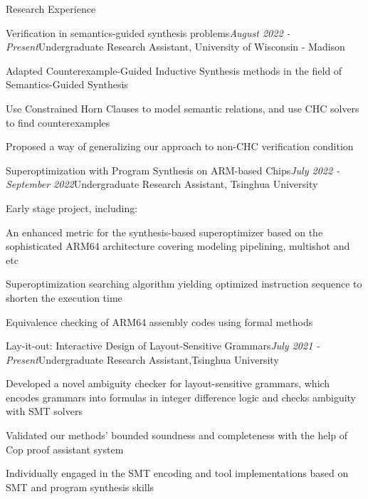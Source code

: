 \documentclass{resume} %
\newcommand{\Jul}{July }
\newcommand{\Aug}{August }
\newcommand{\Sept}{September }
\begin{document}
\begin{rSection}{Research Experience}

\begin{rSubsection}{Verification in semantics-guided synthesis problems}{\em \Aug 2022 - Present}{Undergraduate Research Assistant, \textup{University of Wisconsin - Madison}}{}

\item Adapted Counterexample-Guided Inductive Synthesis methods in the field of Semantics-Guided Synthesis
\item Use Constrained Horn Clauses to model semantic relations, and use CHC solvers to find counterexamples
\item Proposed a way of generalizing our approach to non-CHC verification condition

\end{rSubsection}
  
\begin{rSubsection}{Superoptimization with Program Synthesis on ARM-based Chips}{\em \Jul 2022 - \Sept 2022}{Undergraduate Research Assistant, \textup{Tsinghua University}}{}
    
\item Early stage project, including: 
\item An enhanced metric for the synthesis-based superoptimizer based on the sophisticated ARM64 architecture covering modeling pipelining, multishot and etc
\item Superoptimization searching algorithm yielding optimized instruction sequence to shorten the execution time
\item Equivalence checking of ARM64 assembly codes using formal methods

\end{rSubsection}



\begin{rSubsection}{Lay-it-out: Interactive Design of Layout-Sensitive Grammars}{\em \Jul 2021 - Present}{Undergraduate Research Assistant,\textup{Tsinghua University}}{}
    
\item Developed a novel ambiguity checker for layout-sensitive grammars, which encodes grammars into formulas in integer difference logic and checks ambiguity with SMT solvers
\item Validated our methods' bounded soundness and completeness with the help of Cop proof assistant system
\item Individually engaged in the SMT encoding and tool implementations based on SMT and program synthesis skills

 \end{rSubsection}
    

\end{rSection}
\end{document}
